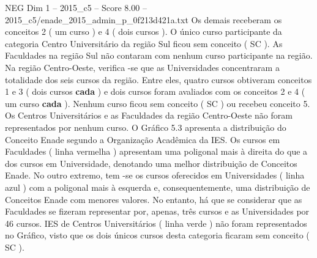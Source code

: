 \begin{textsample}{NEG Dim 1 – 2015\_c5 – Score 8.00 – 2015\_c5/enade\_2015\_admin\_p\_0f213d421a.txt}
Os demais receberam os conceitos 2 ( um curso ) e 4 ( dois cursos ).
O único curso participante da categoria Centro Universitário da região Sul ficou sem conceito ( SC ).
As Faculdades na região Sul não contaram com nenhum curso participante na região.
Na região Centro-Oeste, verifica -se que as Universidades concentraram a totalidade dos seis cursos da região.
Entre eles, quatro cursos obtiveram conceitos 1 e 3 ( dois cursos \textbf{cada} ) e dois cursos foram avaliados com os conceitos 2 e 4 ( um curso \textbf{cada} ).
Nenhum curso ficou sem conceito ( SC ) ou recebeu conceito 5.
Os Centros Universitários e as Faculdades da região Centro-Oeste não foram representados por nenhum curso.
O Gráfico 5.3 apresenta a distribuição do Conceito Enade segundo a Organização Acadêmica da IES.
Os cursos em Faculdades ( linha vermelha ) apresentam uma poligonal mais à direita do que a dos cursos em Universidade, denotando uma melhor distribuição de Conceitos Enade.
No outro extremo, tem -se os cursos oferecidos em Universidades ( linha azul ) com a poligonal mais à esquerda e, consequentemente, uma distribuição de Conceitos Enade com menores valores.
No entanto, há que se considerar que as Faculdades se fizeram representar por, apenas, três cursos e as Universidades por 46 cursos.
IES de Centros Universitários ( linha verde ) não foram representados no Gráfico, visto que os dois únicos cursos desta categoria ficaram sem conceito ( SC ).

\end{textsample}
